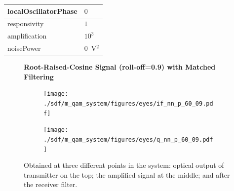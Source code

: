 \begin{refsection}
\begin{table}[H]
\begin{tabular}{|l|l|}
		localOscillatorPhase   & $0$                                                        \\ \hline
		responsivity           & $1$                                                        \\ \hline
		amplification          & $10^3$                                                     \\ \hline
		noisePower   & $0$~V$^2$                             					\\ \hline
	\end{tabular}
\end{table}
\begin{figure}[H]
	\centering

	\textbf{Root-Raised-Cosine Signal (roll-off=0.9) with Matched Filtering}
	\begin{minipage}{\linewidth}
		\centering
	\begin{subfigure}{.45\textwidth}
		\centering
		\texttt{[image: ./sdf/m\_qam\_system/figures/eyes/if\_nn\_p\_60\_09.pdf]}
	\end{subfigure}
	\begin{subfigure}{.45\textwidth}
		\centering
		\texttt{[image: ./sdf/m\_qam\_system/figures/eyes/q\_nn\_p\_60\_09.pdf]}
	\end{subfigure}
	\caption{
		Obtained at
		three different points in the system: optical output of transmitter on the top;
		the amplified signal at the middle; and
		after the receiver filter.
		\label{fig:eyes_nn_rrc_09}}
	\end{minipage}
	
\end{figure}


\end{refsection}

